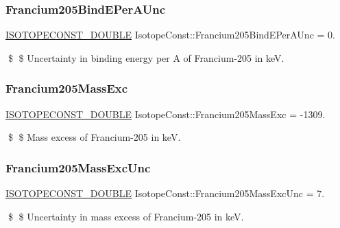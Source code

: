 \subsubsection{\texorpdfstring{Francium205\+Bind\+E\+Per\+A\+Unc}{Francium205BindEPerAUnc}}
{\footnotesize\ttfamily \mbox{\hyperlink{group___isotope_const-_macros_ga8f45a7272ce02c0b4c65c44636ed719a}{I\+S\+O\+T\+O\+P\+E\+C\+O\+N\+S\+T\+\_\+\+D\+O\+U\+B\+LE}} Isotope\+Const\+::\+Francium205\+Bind\+E\+Per\+A\+Unc = 0.}

\$ \$ Uncertainty in binding energy per A of Francium-\/205 in keV. \mbox{\label{group___isotope_const-_francium-_fr205_ga0a6a85199fd4496e33a69755992b7bcd}} 
\subsubsection{\texorpdfstring{Francium205\+Mass\+Exc}{Francium205MassExc}}
{\footnotesize\ttfamily \mbox{\hyperlink{group___isotope_const-_macros_ga8f45a7272ce02c0b4c65c44636ed719a}{I\+S\+O\+T\+O\+P\+E\+C\+O\+N\+S\+T\+\_\+\+D\+O\+U\+B\+LE}} Isotope\+Const\+::\+Francium205\+Mass\+Exc = -\/1309.}

\$ \$ Mass excess of Francium-\/205 in keV. \mbox{\label{group___isotope_const-_francium-_fr205_ga50e5626bf1524128e2b96412e8af707d}} 
\subsubsection{\texorpdfstring{Francium205\+Mass\+Exc\+Unc}{Francium205MassExcUnc}}
{\footnotesize\ttfamily \mbox{\hyperlink{group___isotope_const-_macros_ga8f45a7272ce02c0b4c65c44636ed719a}{I\+S\+O\+T\+O\+P\+E\+C\+O\+N\+S\+T\+\_\+\+D\+O\+U\+B\+LE}} Isotope\+Const\+::\+Francium205\+Mass\+Exc\+Unc = 7.}

\$ \$ Uncertainty in mass excess of Francium-\/205 in keV. \mbox{\label{group___isotope_const-_francium-_fr205_gae479977c8fd18a39de4ce342f16bb672}} 
